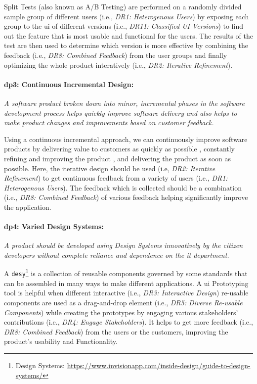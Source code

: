 Split Tests (also known as A/B Testing) are performed on a randomly divided sample group of different users (i.e., \textit{DR1: Heterogenous Users}) by exposing each group to the \ac{ui} of different versions (i.e., \textit{DR11: Classified UI Versions}) to find out the feature that is most usable and functional for the users.
The results of the test are then used to determine which version is more effective by combining the feedback (i.e., \textit{DR8: Combined Feedback}) from the user groups and finally optimizing the whole product interatively (i.e., \textit{DR2: Iterative Refinement}).

\paragraph{\ac{dp}3: Continuous Incremental Design:} \textit{A software product broken down into minor, incremental phases in the software development process helps quickly improve software delivery and also helps to make product changes and improvements based on customer feedback.}

Using a continuous incremental approach, we can continuously improve software products by delivering value to customers as quickly as possible \cite{misc:lean:toyota}, constantly refining and improving the product \cite{misc:lean:planning}, and delivering the product as soon as possible.
Here, the iterative design should be used (i.e, \textit{DR2: Iterative Refinement}) to get continuous feedback from a variety of users (i.e., \textit{DR1: Heterogenous Users}).
The feedback which is collected should be a combination (i.e., \textit{DR8: Combined Feedback}) of various feedback helping significantly improve the application.

\paragraph{\ac{dp}4: Varied Design Systems:} \textit{A product should be developed using Design Systems innovatively by the citizen developers without complete reliance and dependence on the \ac{it} department.}

A \texttt{\ac{desy}}\footnote{Design Systems: \url{https://www.invisionapp.com/inside-design/guide-to-design-systems/}} is a collection of reusable components governed by some standards that can be assembled in many ways to make different applications.
A \ac{ui} Prototyping tool is helpful when different interactive (i.e., \textit{DR3: Interactive Design}) re-usable components are used as a drag-and-drop element (i.e., \textit{DR5: Diverse Re-usable Components}) while creating the prototypes by engaging various stakeholders' contributions (i.e., \textit{DR4: Engage Stakeholders}). 
It helps to get more feedback (i.e., \textit{DR8: Combined Feedback}) from the users or the customers, improving the product's usability and Functionality.


